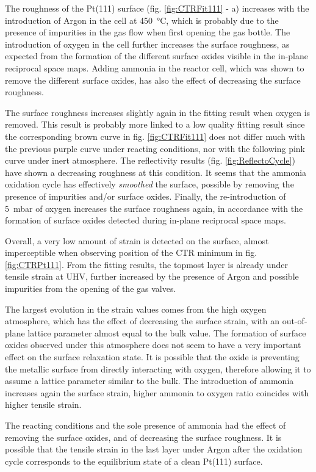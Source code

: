 The roughness of the Pt(111) surface (fig. \ref{fig:CTRFit111} - a) increases with the introduction of Argon in the cell at \qty{450}{\degreeCelsius}, which is probably due to the presence of impurities in the gas flow when first opening the gas bottle.
The introduction of oxygen in the cell further increases the surface roughness, as expected from the formation of the different surface oxides visible in the in-plane reciprocal space maps.
Adding ammonia in the reactor cell, which was shown to remove the different surface oxides, has also the effect of decreasing the surface roughness.

The surface roughness increases slightly again in the fitting result when oxygen is removed.
This result is probably more linked to a low quality fitting result since the corresponding brown curve in fig. \ref{fig:CTRFit111} does not differ much with the previous purple curve under reacting conditions, nor with the following pink curve under inert atmosphere.
The reflectivity results (fig. \ref{fig:ReflectoCycle}) have shown a decreasing roughness at this condition.
It seems that the ammonia oxidation cycle has effectively \textit{smoothed} the surface, possible by removing the presence of impurities and/or surface oxides.
Finally, the re-introduction of \qty{5}{\milli\bar} of oxygen increases the surface roughness again, in accordance with the formation of surface oxides detected during in-plane reciprocal space maps.

Overall, a very low amount of strain is detected on the surface, almost imperceptible when observing position of the CTR minimum in fig. \ref{fig:CTRPt111}.
From the fitting results, the topmost layer is already under tensile strain at UHV, further increased by the presence of Argon and possible impurities from the opening of the gas valves.

The largest evolution in the strain values comes from the high oxygen atmosphere, which has the effect of decreasing the surface strain, with an out-of-plane lattice parameter almost equal to the bulk value.
The formation of surface oxides observed under this atmosphere does not seem to have a very important effect on the surface relaxation state.
It is possible that the oxide is preventing the metallic surface from directly interacting with oxygen, therefore allowing it to assume a lattice parameter similar to the bulk.
The introduction of ammonia increases again the surface strain, higher ammonia to oxygen ratio coincides with higher tensile strain.

The reacting conditions and the sole presence of ammonia had the effect of removing the surface oxides, and of decreasing the surface roughness.
It is possible that the tensile strain in the last layer under Argon after the oxidation cycle corresponds to the equilibrium state of a clean Pt(111) surface.

